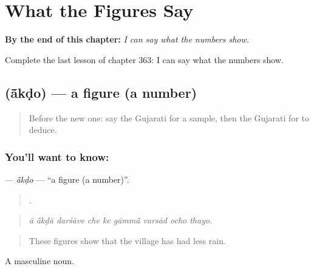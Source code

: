 
\chapter{What the Figures Say}
\label{ch:gu-what-the-figures-say}

\begin{chapteropening}
\textbf{By the end of this chapter:} \emph{I can say what the numbers show.}

Complete the last lesson of chapter 363: I can say what the numbers show.
\end{chapteropening}

\section[\texorpdfstring{\gu{આંકડો} (ā̃kḍo)}{આંકડો (ā̃kḍo)}]{ (ā̃kḍo) — a figure (a number)}

\label{lesson:GU-C363-akdo}



\begin{quote}
Before the new one: say the Gujarati for a sample, then the Gujarati for to deduce.
\end{quote}

\subsection*{You'll want to know: }
\textbf{} — \emph{ā̃kḍo} — \textquotedblleft{}a figure (a number)\textquotedblright{}.

\begin{quote}
        .
\end{quote}

\begin{quote}
\emph{ā ā̃kḍā darśāve che ke gāmmā̃ varsād ocho thayo.}
\end{quote}

\begin{quote}
These figures show that the village has had less rain.
\end{quote}

A masculine noun.

